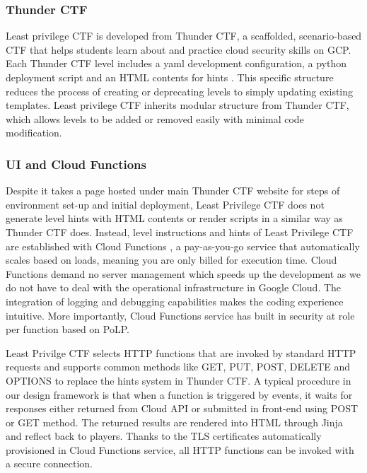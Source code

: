 \documentclass[sigconf]{acmart}
\begin{document}
\subsubsection{Thunder CTF}
Least privilege CTF is developed from Thunder CTF, a scaffolded, scenario-based CTF that helps students learn about and practice cloud security skills on GCP. Each Thunder CTF level includes a yaml development configuration, a python deployment script and an HTML contents for hints \cite{Springer}. This specific structure reduces the process of creating or deprecating levels to simply updating existing templates. Least privilege CTF inherits modular structure from Thunder CTF, which allows levels to be added or removed easily with minimal code modification.

\subsubsection{UI and Cloud Functions}
Despite it takes a page \cite{lst-ctf} hosted under main Thunder CTF website for steps of environment set-up and initial deployment, Least Privilege CTF does not generate level hints with HTML contents or render scripts in a similar way as Thunder CTF does. Instead, level instructions and hints of Least Privilege CTF are established with Cloud Functions \cite{cloudfunc}, a pay-as-you-go service that automatically scales based on loads, meaning you are only billed for execution time. Cloud Functions demand no server management which speeds up the development as we do not have to deal with the operational infrastructure in Google Cloud. The integration of logging and debugging capabilities makes the coding experience intuitive. More importantly, Cloud Functions service has built in security at role per function based on PoLP. 

Least Privilge CTF selects HTTP functions \cite{httpfunc} that are invoked by standard HTTP requests and supports common methods like GET, PUT, POST, DELETE and OPTIONS to replace the hints system in Thunder CTF. A typical procedure in our design framework is that when a function is triggered by events, it waits for responses either returned from Cloud API or submitted in front-end using POST or GET method. The returned results are rendered into HTML through Jinja and reflect back to players. Thanks to the TLS certificates automatically provisioned in Cloud Functions service,  all HTTP functions can be invoked with a secure connection. 
\end{document}

